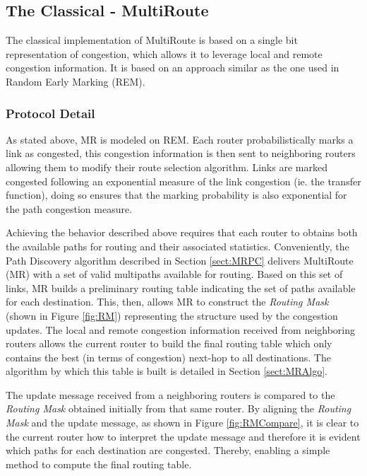  
\subsection{The Classical - MultiRoute}

The classical implementation of MultiRoute is based on a single bit representation of congestion, which allows it to leverage local and remote congestion information. It is based on an approach similar as the one used in Random Early Marking \cite{REM} (REM). 

\subsubsection{Protocol Detail}

As stated above, MR is modeled on REM. Each router probabilistically marks a link as congested, this congestion information is then sent to neighboring routers allowing them to modify their route selection algorithm. Links are marked congested following an exponential measure of the link congestion (ie. the transfer function), doing so ensures that the marking probability is also exponential for the path congestion measure.

Achieving the behavior described above requires that each router to obtains both the
available paths for routing and their associated statistics. Conveniently, the
Path Discovery algorithm described in Section \ref{sect:MRPC} delivers
MultiRoute (MR) \cite{MR} with a set of valid multipaths available for
routing. Based on this set of links, MR builds a preliminary routing table
indicating the set of paths available for each destination. This, then, allows
MR to construct the \textit{Routing Mask} (shown in Figure \ref{fig:RM})
representing the structure used by the congestion updates. The local and remote
congestion information received from neighboring routers allows the current
router to build the final routing table which only contains the best (in terms
of congestion) next-hop to all destinations. The algorithm by which this table
is built is detailed in Section \ref{sect:MRAlgo}. 

The update message received from a neighboring routers is compared to the
\textit{Routing Mask} obtained initially from that same router. By aligning the
\textit{Routing Mask} and the update message, as shown in Figure
\ref{fig:RMCompare}, it is clear to the current router how to interpret the
update message and therefore it is evident which paths for each destination
are congested. Thereby, enabling a simple method to compute the final
routing table. 

